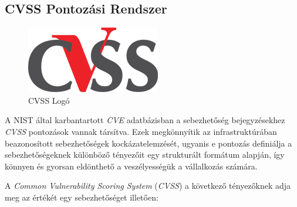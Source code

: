 \documentclass[a4paper,12pt]{article}
\begin{document}
\subsection{CVSS Pontozási Rendszer}
	
	\begin{figure}
		\vspace{-10pt}
		\centering
		\includegraphics[scale=0.4]{cvss.png}
		\caption{CVSS Logó}
	\end{figure}
	
	A NIST által karbantartott \textit{CVE} adatbázisban a sebezhetőség bejegyzésekhez \textit{CVSS} pontozások vannak társítva. Ezek megkönnyítik az infrastruktúrában beazonosított sebezhetőségek kockázatelemzését, ugyanis e pontozás definiálja a sebezhetőségeknek különböző tényezőit egy strukturált formátum alapján, így könnyen és gyorsan eldönthető a veszélyességük a vállalkozás számára.
	
	A \textit{Common Vulnerability Scoring System}\cite{cvssv2} (\textit{CVSS}) a következő tényezőknek adja meg az értékét egy sebezhetőséget illetően:
	
\end{document}
